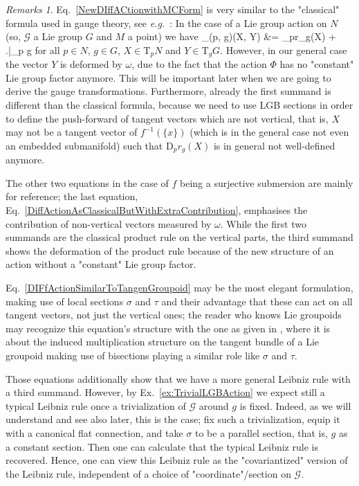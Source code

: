 \documentclass[a4paper,oneside,11pt,bibliography=totoc]{scrartcl}
\makeatletter
\def\oversortoftilde#1{\mathop{\vbox{\m@th\ialign{##\crcr\noalign{\kern3\p@}%
      \sortoftildefill\crcr\noalign{\kern3\p@\nointerlineskip}%
      $\hfil\displaystyle{#1}\hfil$\crcr}}}\limits}
\def\sortoftildefill{$\m@th \setbox\z@\hbox{$\braceld$}%
  \braceld\leaders\vrule \@height\ht\z@ \@depth\z@\hfill\braceru$}
\def\bas#1\eas{\begin{align*}#1\end{align*}}
\theoremstyle{plain}
\theoremstyle{remark}
\newtheorem{remark}[theorem]{Remarks}
\theoremstyle{definition}
\makeatother
\begin{document}
\begin{remark}
\leavevmode\newline
Eq.\ \eqref{NewDIffACtionwithMCForm} is very similar to the "classical" formula used in gauge theory, see \textit{e.g.}\ \cite[\S 3.5, Prop.\ 3.5.4, page 146]{Hamilton}: In the case of a Lie group action on $N$ (so, $\mathcal{G}$ a Lie group $G$ and $M$ a point) we have
\bas
\mathrm{D}_{(p, g)}\Phi(X, Y)
&=
_pr_g(X)
	+ \mleft.\oversortoftilde{(\mu_G)_g(Y)}\mright|_{p \cdot g}
\eas
for all $p \in N$, $g \in G$, $X \in \mathrm{T}_pN$ and $Y \in \mathrm{T}_g G$.
However, in our general case the vector $Y$ is deformed by $\omega$, due to the fact that the action $\Phi$ has no "constant" Lie group factor anymore. This will be important later when we are going to derive the gauge transformations. Furthermore, already the first summand is different than the classical formula, because we need to use LGB sections in order to define the push-forward of tangent vectors which are not vertical, that is, $X$ may not be a tangent vector of $f^{-1}(\{x\})$ (which is in the general case not even an embedded submanifold) such that $\mathrm{D}_p r_g(X)$ is in general not well-defined anymore.

The other two equations in the case of $f$ being a surjective submersion are mainly for reference; the last equation, Eq.\ \eqref{DiffActionAsClassicalButWithExtraContribution}, emphasises the contribution of non-vertical vectors measured by $\omega$. While the first two summands are the classical product rule on the vertical parts, the third summand shows the deformation of the product rule because of the new structure of an action without a "constant" Lie group factor.

Eq.\ \eqref{DIFfActionSimilarToTangenGroupoid} may be the most elegant formulation, making use of local sections $\sigma$ and $\tau$ and their advantage that these can act on all tangent vectors, not just the vertical ones; the reader who knows Lie groupoids may recognize this equation's structure with the one as given in \cite[\S 1.4, Thm.\ 1.4.14, page 28]{mackenzieGeneralTheory}, where it is about the induced multiplication structure on the tangent bundle of a Lie groupoid making use of bisections playing a similar role like $\sigma$ and $\tau$.

Those equations additionally show that we have a more general Leibniz rule with a third summand. However, by Ex.\ \ref{ex:TrivialLGBAction} we expect still a typical Leibniz rule once a trivialization of $\mathcal{G}$ around $g$ is fixed. Indeed, as we will understand and see also later, this is the case; fix such a trivialization, equip it with a canonical flat connection, and take $\sigma$ to be a parallel section, that is, $g$ as a constant section. Then one can calculate that the typical Leibniz rule is recovered. Hence, one can view this Leibniz rule as the "covariantized" version of the Leibniz rule, independent of a choice of "coordinate"/section on $\mathcal{G}$. 
\end{remark}
\end{document}

